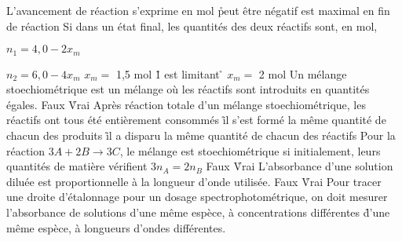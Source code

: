 \q
L'avancement de réaction
\rv
s'exprime en mol
\r
peut être négatif
\rv
est maximal en fin de réaction
\q
Si dans un état final, les quantités des deux réactifs sont, en mol, 

$n_1 = 4,0 - 2x_m$

$n_2 = 6,0 - 4x_m$
\rv
$x_m=$ 1,5 mol
\r
1 est limitant
\r
$x_m=$ 2 mol
\q
Un mélange stoechiométrique est un mélange o\`u les réactifs sont introduits en quantités égales.
\rv
Faux
\r
Vrai
\q
Après réaction totale d'un mélange stoechiométrique, 
\rv
les réactifs ont tous été entièrement consommés
\r
il s'est formé la même quantité de chacun des produits
\r
il a disparu la même quantité de chacun des réactifs
\q
Pour la réaction $3 A + 2 B \longrightarrow 3 C$, le mélange est stoechiométrique si initialement, leurs quantités de matière vérifient $3 n_A = 2 n_B$
\rv
Faux
\r
Vrai
\q
L'absorbance d'une solution diluée est proportionnelle à la longueur d'onde utilisée.
\rv
Faux
\r
Vrai
\q
Pour tracer une droite d'étalonnage pour un dosage spectrophotométrique, on doit mesurer l'absorbance de solutions
\rv
d'une même espèce, à concentrations différentes
\r
d'une même espèce, à longueurs d'ondes différentes. 



